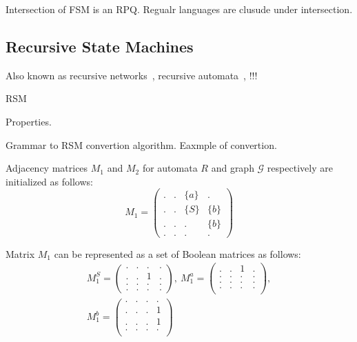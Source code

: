 Intersection of FSM is an RPQ.
Regualr languages are clusude under intersection.

\subsection{Recursive State Machines}



Also known as recursive networks~\cite{!!!}, recursive automata~\cite{!!!}, !!!  

\begin{definition}
RSM
\end{definition}

Properties.

Grammar to RSM convertion algorithm.
Eaxmple of convertion.


Adjacency matrices $M_1$ and $M_2$ for automata $R$ and graph $\mathcal{G}$ respectively are initialized as follows:
    $$
    M_1 =
    \begin{pmatrix}
    . & . & \{a\} & .     \\
    . & . & \{S\} & \{b\} \\
    . & . & . & \{b\}     \\
    . & . & . & .
    \end{pmatrix}
    $$

Matrix $M_1$ can be represented as a set of Boolean matrices as follows:
\begin{align*}
M_1^S =
\begin{pmatrix}      
    . & . & . & .   \\
    . & . & 1 & .   \\
    . & . & . & .   \\
    . & . & . & .   
\end{pmatrix},~M_1^a =
\begin{pmatrix}       
   . & . & 1 & .   \\
   . & . & . & .   \\
   . & . & . & .   \\
   . & . & . & .   \\
\end{pmatrix}, \\ M_1^b =
\begin{pmatrix}      
    . & . & . & .   \\
    . & . & . & 1   \\
    . & . & . & 1   \\
    . & . & . & .   \\
\end{pmatrix}
\end{align*}



